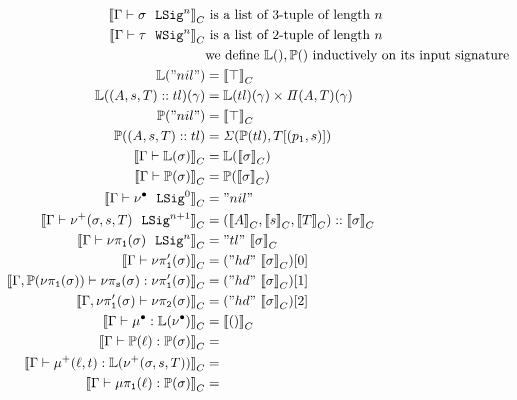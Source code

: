 \begin{align*}
  \denotesC{\goodSig{\Gm}{\lsig}{n}} & \text{ is a list of 3-tuple of length $n$  } \\
  \denotesC{\goodWSig{\Gm}{\wsig}{n}} &\text{ is a list of 2-tuple of length $n$ } \\
  & \text{we define }\TyLkg{}, \TyTkg{} \text{ inductively on its input signature} \\ 
  \mathit{\cL}("nil") &= \denotesC{\top} \\
  \mathit{\cL}((A,s,T) :: tl)(\gm) &= {\mathit{\cL}(tl)}(\gm) \times \mathit{\Pi}(A,T)(\gm) \\
  \mathit{\cP}("nil") &= \denotesC{\top}\\
  \mathit{\cP}((A,s,T) :: tl) &= \mathit{\Sigma}(\mathit{\cP}(tl), \sub{T}{(p_1, s)})\\
  \denotesC{\goodType{\Gm}{\TyLkg{\lsig}}{}} &= \mathit{\cL}(\denotesC{\lsig}) \\
  \denotesC{\goodType{\Gm}{\TyTkg{\lsig}}{}} &= \mathit{\cP}(\denotesC{\lsig}) \\
  \denotesC{\goodSig{\Gm}{\LSigEmp}{0}} &= "nil"\\ 
  \denotesC{\goodSig{\Gm}{\LSigAdd{\lsig}{s}{T}}{n+1}} &= (\denotesC{A}, \denotesC{s}, \denotesC{T})::\denotesC{\lsig}\\ 
  \denotesC{\goodSig{\Gm}{\lsigproj{1}{\lsig}}{n}} &= "tl"~\denotesC{\lsig}\\ 
  \denotesC{\goodType{\Gm}{\lsigprojT{\lsig}}{}} &= ("hd"~\denotesC{\lsig})[0]\\ 
  \denotesC{\goodTerm{\Gm, \TyTkg{\lsigproj{1}{\lsig}}}{\lsigproj{s}{\lsig}}{\lsigprojT{\lsig}}} &= ("hd"~\denotesC{\lsig})[1]\\ 
  \denotesC{\goodType{\Gm, \lsigprojT{\lsig}}{\lsigproj{2}{\lsig}}{}} &= ("hd"~\denotesC{\lsig})[2]\\
  \denotesC{\goodTerm{\Gm}{\LkgEmp}{\TyLkg{\LSigEmp}}} &= \denotesC{\unit} \\
  \denotesC{\goodTerm{\Gm}{\Tkg{\lkg}}{\TyTkg{\lsig}}} &=  \\
  \denotesC{\goodTerm{\Gm}{\LkgAdd{\lkg}{t}}{\TyLkg{\LSigAdd{\lsig}{s}{T}}}} &= \\
  \denotesC{\goodTerm{\Gm}{\lkgproj{1}{\ell}}{\TyTkg{\lsig}}} &= \\

\end{align*}
